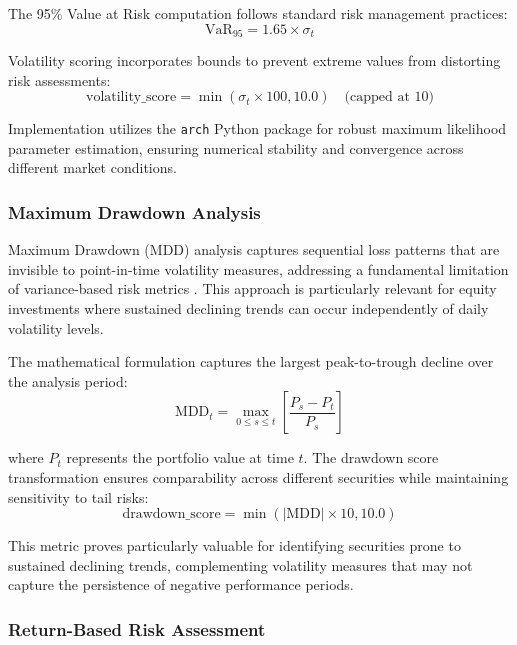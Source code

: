 \documentclass[3p,times,procedia]{elsarticle}
\begin{document}
The 95\% Value at Risk computation follows standard risk management practices:
\begin{equation}
\text{VaR}_{95} = 1.65 \times \sigma_t
\end{equation}

Volatility scoring incorporates bounds to prevent extreme values from distorting risk assessments:
\begin{equation}
\text{volatility\_score} = \min(\sigma_t \times 100, 10.0) \quad \text{(capped at 10)}
\end{equation}

Implementation utilizes the \texttt{arch} Python package for robust maximum likelihood parameter estimation, ensuring numerical stability and convergence across different market conditions.

\subsubsection{{Maximum Drawdown Analysis}}

Maximum Drawdown (MDD) analysis captures sequential loss patterns that are invisible to point-in-time volatility measures, addressing a fundamental limitation of variance-based risk metrics \cite{Jorion2001}. This approach is particularly relevant for equity investments where sustained declining trends can occur independently of daily volatility levels.

The mathematical formulation captures the largest peak-to-trough decline over the analysis period:
\begin{equation}
\text{MDD}_t = \max_{0 \leq s \leq t} \left[ \frac{P_s - P_t}{P_s} \right]
\end{equation}

where $P_t$ represents the portfolio value at time $t$. The drawdown score transformation ensures comparability across different securities while maintaining sensitivity to tail risks:
\begin{equation}
\text{drawdown\_score} = \min(|\text{MDD}| \times 10, 10.0)
\end{equation}

This metric proves particularly valuable for identifying securities prone to sustained declining trends, complementing volatility measures that may not capture the persistence of negative performance periods.

\subsubsection{{Return-Based Risk Assessment}}
\end{document}
